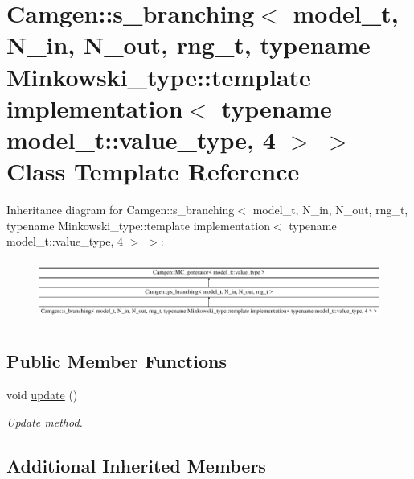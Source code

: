 \hypertarget{a00480}{\section{Camgen\-:\-:s\-\_\-branching$<$ model\-\_\-t, N\-\_\-in, N\-\_\-out, rng\-\_\-t, typename Minkowski\-\_\-type\-:\-:template implementation$<$ typename model\-\_\-t\-:\-:value\-\_\-type, 4 $>$ $>$ Class Template Reference}
\label{a00480}
}
Inheritance diagram for Camgen\-:\-:s\-\_\-branching$<$ model\-\_\-t, N\-\_\-in, N\-\_\-out, rng\-\_\-t, typename Minkowski\-\_\-type\-:\-:template implementation$<$ typename model\-\_\-t\-:\-:value\-\_\-type, 4 $>$ $>$\-:\begin{figure}[H]
\begin{center}
\leavevmode
\includegraphics[height=2.024096cm]{a00480}
\end{center}
\end{figure}
\subsection*{Public Member Functions}
\begin{DoxyCompactItemize}
\item 
void \hyperlink{a00480_ac6456d02ca52575ab6181a175db7655d}{update} ()
\begin{DoxyCompactList}\small\item\em Update method. \end{DoxyCompactList}\end{DoxyCompactItemize}
\subsection*{Additional Inherited Members}


